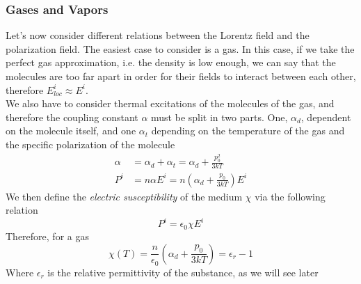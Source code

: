 \documentclass[../electromagnetism]{subfiles}
\begin{document}
\subsubsection{Gases and Vapors}
Let's now consider different relations between the Lorentz field and the polarization field. The easiest case to consider is a gas. In this case, if we take the perfect gas approximation, i.e. the density is low enough, we can say that the molecules are too far apart in order for their fields to interact between each other, therefore $E^i_{loc}\approx E^i$.\\
We also have to consider thermal excitations of the molecules of the gas, and therefore the coupling constant $\alpha$ must be split in two parts. One, $\alpha_d$, dependent on the molecule itself, and one $\alpha_t$ depending on the temperature of the gas and the specific polarization of the molecule
\begin{equation*}
	\begin{aligned}
		\alpha&=\alpha_d+\alpha_t=\alpha_d+\frac{p_0^2}{3kT}\\
		P^i&=n\alpha E^i=n\left( \alpha_d+\frac{p_0}{3kT} \right)E^i
	\end{aligned}
\end{equation*}
We then define the \textit{electric susceptibility} of the medium $\chi$ via the following relation
\begin{equation}
	P^i=\epsilon_0\chi E^i
	\label{eq:electricsusceptibility}
\end{equation}
Therefore, for a gas
\begin{equation}
	\chi(T)=\frac{n}{\epsilon_0}\left( \alpha_d+\frac{p_0}{3kT} \right)=\epsilon_r-1
	\label{eq:suscgas}
\end{equation}
Where $\epsilon_r$ is the relative permittivity of the substance, as we will see later
\end{document}
